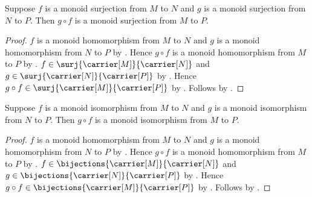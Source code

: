\begin{theorem}\label{monoid_surjection_composition}
    Suppose $f$ is a monoid surjection from $M$ to $N$ and
        $g$ is a monoid surjection from $N$ to $P$.
    Then $g\circ f$ is a monoid surjection from $M$ to $P$.
\end{theorem}
\begin{proof}
    $f$ is a monoid homomorphism from $M$ to $N$ and
        $g$ is a monoid homomorphism from $N$ to $P$ by
        .
    Hence $g\circ f$ is a monoid homomorphism from $M$ to $P$ by
        .
    $f\in\surj{\carrier[M]}{\carrier[N]}$ and
        $g\in\surj{\carrier[N]}{\carrier[P]}$ by
        .
    Hence $g\circ f\in\surj{\carrier[M]}{\carrier[P]}$ by
        .
    Follows by .
\end{proof}

\begin{theorem}\label{monoid_isomorphism_composition}
    Suppose $f$ is a monoid isomorphism from $M$ to $N$ and
        $g$ is a monoid isomorphism from $N$ to $P$.
    Then $g\circ f$ is a monoid isomorphism from $M$ to $P$.
\end{theorem}
\begin{proof}
    $f$ is a monoid homomorphism from $M$ to $N$ and
        $g$ is a monoid homomorphism from $N$ to $P$ by
        .
    Hence $g\circ f$ is a monoid homomorphism from $M$ to $P$ by
        .
    $f\in\bijections{\carrier[M]}{\carrier[N]}$ and
        $g\in\bijections{\carrier[N]}{\carrier[P]}$ by
        .
    Hence $g\circ f\in\bijections{\carrier[M]}{\carrier[P]}$ by
        .
    Follows by .
\end{proof}

